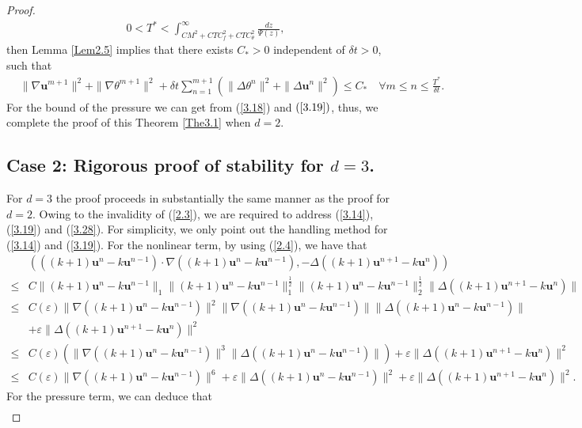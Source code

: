 \documentclass[10pt]{article}
\begin{document}
\begin{proof}
		\begin{align}\label{3.34}
			0 < T^* < \int_{C M^2 + C T C_f^2 + C T C_{\theta}^2}^{\infty} \frac{dz}{\Psi(z)},
		\end{align}
		then Lemma \ref{Lem2.5} implies that there exists $C_*>0$ independent of $\delta t>0$, such that
		{ 
		\begin{align}\label{3.35}
			&\|\nabla\bm{u}^{m+1}\|^2+\|\nabla\theta^{m+1}\|^2+\delta t\sum_{n=1}^{m+1}(\|\Delta\theta^{n}\|^2+\|\Delta\bm{u}^n\|^2)\leq C_*  \quad    \forall m\leq n\leq\frac{T^*}{\delta t}.
		\end{align}}
	For the bound of the pressure we can get from (\ref{3.18}) and $(\ref{3.19})$, thus, we complete the proof of this Theorem \ref{The3.1} when $d=2$. 
		\subsection*{Case 2: Rigorous proof of  stability for \(d = 3\).}
		For $d=3$ the proof proceeds in substantially the same manner as the proof for $d=2$. Owing to the invalidity of (\ref{2.3}), we are required to address (\ref{3.14}), (\ref{3.19}) and (\ref{3.28}). For simplicity, we only point out the handling method for (\ref{3.14}) and (\ref{3.19}). For the nonlinear term, by using (\ref{2.4}), we have that
		{ 
			\begin{align}
			&(((k+1)\bm{u}^n-k\bm{u}^{n-1})\cdot\nabla((k+1)\bm{u}^n-k\bm{u}^{n-1}),-\Delta((k+1)\bm{u}^{n+1}-k\bm{u}^n))\nonumber\\
			\leq & C\|(k+1)\bm{u}^n-k\bm{u}^{n-1}\|_1\|(k+1)\bm{u}^n-k\bm{u}^{n-1}\|_1^\frac{1}{2}\|(k+1)\bm{u}^n-k\bm{u}^{n-1}\|_2^\frac{1}{2}\|\Delta((k+1)\bm{u}^{n+1}-k\bm{u}^n)\|\nonumber\\
			\leq & C(\varepsilon)\|\nabla((k+1)\bm{u}^n-k\bm{u}^{n-1})\|^2\|\nabla((k+1)\bm{u}^n-k\bm{u}^{n-1})\|\|\Delta((k+1)\bm{u}^n-k\bm{u}^{n-1})\|\nonumber\\
			&  +\varepsilon\|\Delta((k+1)\bm{u}^{n+1}-k\bm{u}^n)\|^2\nonumber\\
			\leq &
			C(\varepsilon)(\|\nabla((k+1)\bm{u}^n-k\bm{u}^{n-1})\|^3\|\Delta((k+1)\bm{u}^n-k\bm{u}^{n-1})\|) +\varepsilon\|\Delta((k+1)\bm{u}^{n+1}-k\bm{u}^n)\|^2\nonumber\\
			\leq & C(\varepsilon)\|\nabla((k+1)\bm{u}^n-k\bm{u}^{n-1})\|^6
			+\varepsilon\|\Delta((k+1)\bm{u}^n-k\bm{u}^{n-1})\|^2+\varepsilon\|\Delta((k+1)\bm{u}^{n+1}-k\bm{u}^n)\|^2.
			\end{align}}
		For the pressure term, we can deduce that
		\begin{align}

\end{align}
\end{proof}
\end{document}
